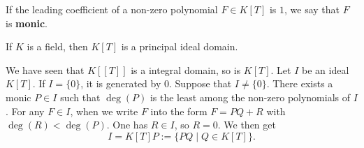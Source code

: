 \begin{definitionenv}
    If the leading coefficient of a non-zero polynomial $F\in K[T]$ is $1$, we say that $F$ is \textbf{monic}.
\end{definitionenv}
\begin{theoremenv}
    If $K$ is a field, then $K[T]$ is a principal ideal domain.
\end{theoremenv}
\begin{proofenv}
    We have seen that $K[\![T]\!]$ is a integral domain, so is $K[T]$. Let $I$ be an ideal $K[T]$. If $I=\{0\}$, it is generated by $0$. Suppose that $I\not=\{0\}$. There exists a monic  $P\in I$ such that $\deg(P)$ is the least among the non-zero polynomials of $I$. For any $F\in I$, when we write $F$ into the form $F=PQ+R$ with $\deg(R)<\deg(P)$. One has $R\in I$, so $R=0$. We then get $$I=K[T]P:=\{PQ\mid Q\in K[T]\}.$$
\end{proofenv}